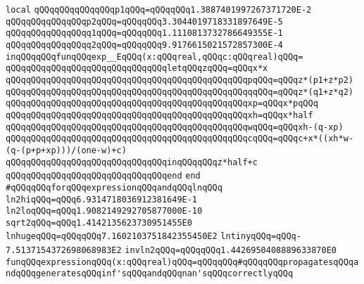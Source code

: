 \newline
\verb|local|\newline
\verb|qQQqqQQqqQQqqQQqp1qQQq=qQQqqQQq1.3887401997267371720E-2|\newline
\verb|qQQqqQQqqQQqqQQqp2qQQq=qQQqqQQq3.3044019718331897649E-5|\newline
\verb|qQQqqQQqqQQqqQQqq1qQQq=qQQqqQQq1.1110813732786649355E-1|\newline
\verb|qQQqqQQqqQQqqQQqq2qQQq=qQQqqQQq9.9176615021572857300E-4|\newline
\verb|inqQQqqQQqfunqQQqexp__EqQQq(x:qQQqreal,qQQqc:qQQqreal)qQQq=|\newline
\verb|qQQqqQQqqQQqqQQqqQQqqQQqqQQqqQQqletqQQqzqQQq=qQQqx*x|\newline
\verb|qQQqqQQqqQQqqQQqqQQqqQQqqQQqqQQqqQQqqQQqqQQqqQQqpqQQq=qQQqz*(p1+z*p2)|\newline
\verb|qQQqqQQqqQQqqQQqqQQqqQQqqQQqqQQqqQQqqQQqqQQqqQQqqqQQq=qQQqz*(q1+z*q2)|\newline
\verb|qQQqqQQqqQQqqQQqqQQqqQQqqQQqqQQqqQQqqQQqqQQqqQQqxp=qQQqx*pqQQq|\newline
\verb|qQQqqQQqqQQqqQQqqQQqqQQqqQQqqQQqqQQqqQQqqQQqqQQqxh=qQQqx*half|\newline
\verb|qQQqqQQqqQQqqQQqqQQqqQQqqQQqqQQqqQQqqQQqqQQqqQQqwqQQq=qQQqxh-(q-xp)|\newline
\verb|qQQqqQQqqQQqqQQqqQQqqQQqqQQqqQQqqQQqqQQqqQQqqQQqcqQQq=qQQqc+x*((xh*w-(q-(p+p+xp)))/(one-w)+c)|\newline
\verb|qQQqqQQqqQQqqQQqqQQqqQQqqQQqqQQqinqQQqqQQqz*half+c|\newline
\verb|qQQqqQQqqQQqqQQqqQQqqQQqqQQqqQQqend|\newline
\verb|end|\newline
\newline
\verb|#qQQqqQQqforqQQqexpressionqQQqandqQQqlnqQQq|\newline
\verb|ln2hiqQQq=qQQq6.9314718036912381649E-1|\newline
\verb|ln2loqQQq=qQQq1.9082149292705877000E-10|\newline
\verb|sqrt2qQQq=qQQq1.4142135623730951455E0|\newline
\verb|lnhugeqQQq=qQQqqQQq7.1602103751842355450E2|\newline
\verb|lntinyqQQq=qQQq-7.5137154372698068983E2|\newline
\verb|invln2qQQq=qQQqqQQq1.4426950408889633870E0|\newline
\newline
\verb|funqQQqexpressionqQQq(x:qQQqreal)qQQq=qQQqqQQq#qQQqqQQqpropagatesqQQqandqQQqgeneratesqQQqinf'sqQQqandqQQqnan'sqQQqcorrectlyqQQq|\newline
